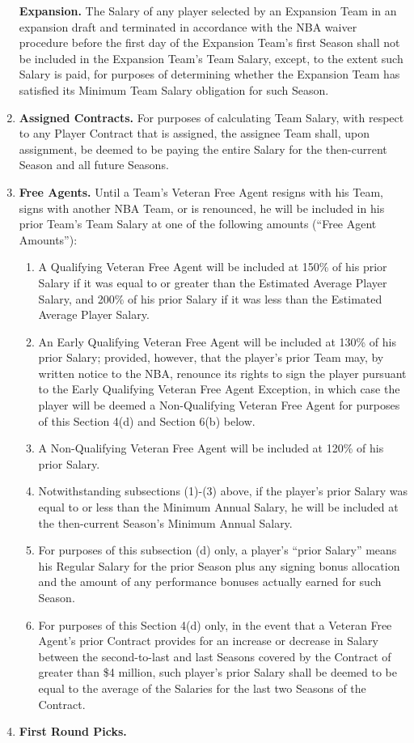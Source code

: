 \documentclass[
]{book}
\providecommand{\tightlist}{%
  \setlength{\itemsep}{0pt}\setlength{\parskip}{0pt}}
\begin{document}
\begin{enumerate}
  \textbf{Expansion.} The Salary of any player selected by an Expansion Team in an expansion draft and terminated in accordance with the NBA waiver procedure before the first day of the Expansion Team's first Season shall not be included in the Expansion Team's Team Salary, except, to the extent such Salary is paid, for purposes of determining whether the Expansion Team has satisfied its Minimum Team Salary obligation for such Season.
\item
  \textbf{Assigned Contracts.} For purposes of calculating Team Salary, with respect to any Player Contract that is assigned, the assignee Team shall, upon assignment, be deemed to be paying the entire Salary for the then-current Season and all future Seasons.
\item
  \textbf{Free Agents.} Until a Team's Veteran Free Agent resigns with his Team, signs with another NBA Team, or is renounced, he will be included in his prior Team's Team Salary at one of the following amounts (``Free Agent Amounts''):

  \begin{enumerate}
  \def\labelenumii{(\arabic{enumii})}
  \tightlist
  \item
    A Qualifying Veteran Free Agent will be included at 150\% of his prior Salary if it was equal to or greater than the Estimated Average Player Salary, and 200\% of his prior Salary if it was less than the Estimated Average Player Salary.
  \item
    An Early Qualifying Veteran Free Agent will be included at 130\% of his prior Salary; provided, however, that the player's prior Team may, by written notice to the NBA, renounce its rights to sign the player pursuant to the Early Qualifying Veteran Free Agent Exception, in which case the player will be deemed a Non-Qualifying Veteran Free Agent for purposes of this Section 4(d) and Section 6(b) below.
  \item
    A Non-Qualifying Veteran Free Agent will be included at 120\% of his prior Salary.
  \item
    Notwithstanding subsections (1)-(3) above, if the player's prior Salary was equal to or less than the Minimum Annual Salary, he will be included at the then-current Season's Minimum Annual Salary.
  \item
    For purposes of this subsection (d) only, a player's ``prior Salary'' means his Regular Salary for the prior Season plus any signing bonus allocation and the amount of any performance bonuses actually earned for such Season.
  \item
    For purposes of this Section 4(d) only, in the event that a Veteran Free Agent's prior Contract provides for an increase or decrease in Salary between the second-to-last and last Seasons covered by the Contract of greater than \$4 million, such player's prior Salary shall be deemed to be equal to the average of the Salaries for the last two Seasons of the Contract.
  \end{enumerate}
\item
  \textbf{First Round Picks.}


\end{enumerate}
\end{document}
